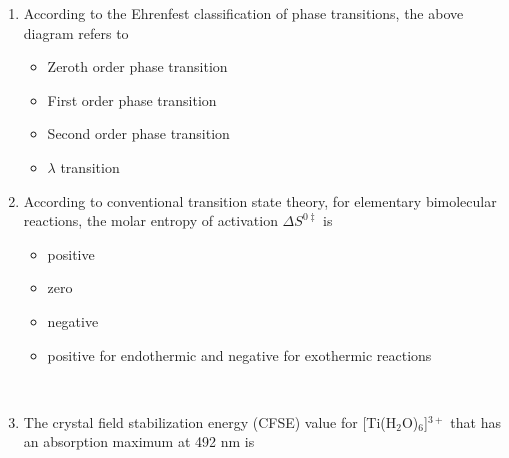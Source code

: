 \documentclass[journal,12pt,onecolumn]{IEEEtran}
\theoremstyle{remark}
\begin{document}
\begin{enumerate}
\item    \hspace{0.5cm}  \hfill{}

\begin{center}
\end{center}

According to the Ehrenfest classification of phase transitions, the above diagram refers to

\begin{multicols}{2}
\begin{itemize}[label=(A)]
    \item Zeroth order phase transition
    \item First order phase transition
    \item Second order phase transition
    \item $\lambda$ transition
\end{itemize}
\end{multicols}
 

\item    \hspace{0.5cm} According to conventional transition state theory, for elementary bimolecular reactions, the molar entropy of activation $\Delta S^{0\ddagger}$ is  \hfill{}

\begin{multicols}{2}
\begin{itemize}[label=(A)]
    \item positive
    \item zero
    \item negative
    \item positive for endothermic and negative for exothermic reactions
\end{itemize}
\end{multicols}

\newpage
\

\item    \hspace{0.5cm} The crystal field stabilization energy (CFSE) value for [Ti(H$_2$O)$_6$]$^{3+}$ that has an absorption maximum at 492 nm is  \hfill{}


\end{enumerate}
\end{document}
